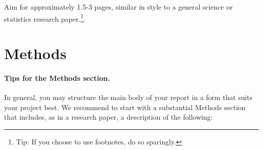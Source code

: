 \documentclass{statsmsc}
\begin{document}
Aim for approximately 1.5-3 pages, similar in style to a general science or statistics research paper.\footnote{Tip: If you choose to use footnotes, do so sparingly.}.





\section{Methods}\label{sec:methods}


\paragraph{Tips for the Methods section.} In general, you may structure the main body of your report in a form that suits your project best. We recommend to start with a substantial Methods section that includes, as in a research paper, a description of the following:
\end{document}
